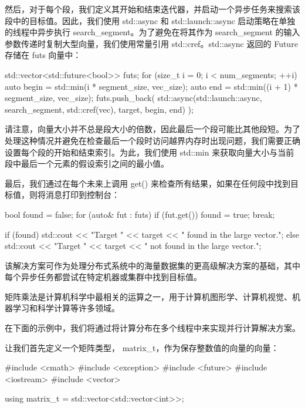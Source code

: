 然后，对于每个段，我们定义其开始和结束迭代器，并启动一个异步任务来搜索该段中的目标值。因此，我们使用 std::async 和 std::launch::async 启动策略在单独的线程中异步执行 search\_segment。为了避免在将其作为 search\_segment 的输入参数传递时复制大型向量，我们使用常量引用 std::cref。std::async 返回的 Future 存储在 futs 向量中：

\begin{cpp}
std::vector<std::future<bool>> futs;
for (size_t i = 0; i < num_segments; ++i) {
    auto begin = std::min(i * segment_size, vec_size);
    auto end = std::min((i + 1) * segment_size, vec_size);
    futs.push_back( std::async(std::launch::async,
                               search_segment,
                               std::cref(vec),
                               target, begin, end) );
}
\end{cpp}

请注意，向量大小并不总是段大小的倍数，因此最后一个段可能比其他段短。为了处理这种情况并避免在检查最后一个段时访问越界内存时出现问题，我们需要正确设置每个段的开始和结束索引。为此，我们使用 std::min 来获取向量大小与当前段中最后一个元素的假设索引之间的最小值。

最后，我们通过在每个未来上调用 get() 来检查所有结果，如果在任何段中找到目标值，则将消息打印到控制台：

\begin{cpp}
bool found = false;
for (auto& fut : futs) {
    if (fut.get()) {
        found = true;
        break;
    }
}

if (found) {
    std::cout << "Target " << target
              << " found in the large vector.\n";
} else {
    std::cout << "Target " << target
              << " not found in the large vector.\n";
}
\end{cpp}

该解决方案可作为处理分布式系统中的海量数据集的更高级解决方案的基础，其中每个异步任务都尝试在特定机器或集群中找到目标值。


矩阵乘法是计算机科学中最相关的运算之一，用于计算机图形学、计算机视觉、机器学习和科学计算等许多领域。

在下面的示例中，我们将通过将计算分布在多个线程中来实现并行计算解决方案。

让我们首先定义一个矩阵类型， matrix\_t，作为保存整数值的向量的向量：

\begin{cpp}
#include <cmath>
#include <exception>
#include <future>
#include <iostream>
#include <vector>

using matrix_t = std::vector<std::vector<int>>;
\end{cpp}

